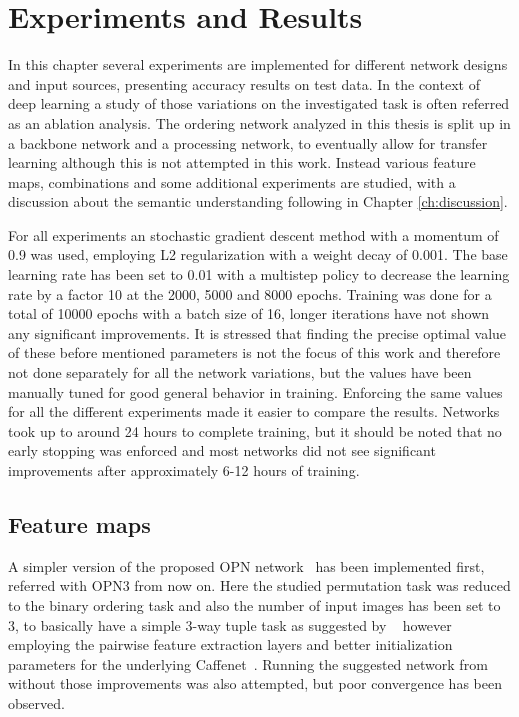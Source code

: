%
\newpage
\chapter{Experiments and Results}
\label{ch:experimentsandresults}
In this chapter several experiments are implemented for different network designs and input sources, presenting accuracy results on test data. In the context of deep learning a study of those variations on the investigated task is often referred as an ablation analysis. The ordering network analyzed in this thesis is split up in a backbone network and a processing network, to eventually allow for transfer learning although this is not attempted in this work. Instead various feature maps, combinations and some additional experiments are studied, with a discussion about the semantic understanding following in Chapter \ref{ch:discussion}.

For all experiments an stochastic gradient descent method with a momentum of 0.9 was used, employing L2 regularization with a weight decay of 0.001. The base learning rate has been set to 0.01 with a multistep policy to decrease the learning rate by a factor 10 at the 2000, 5000 and 8000 epochs. Training was done for a total of 10000 epochs with a batch size of 16, longer iterations have not shown any significant improvements. It is stressed that finding the precise optimal value of these before mentioned parameters is not the focus of this work and therefore not done separately for all the network variations, but the values have been manually tuned for good general behavior in training. Enforcing the same values for all the different experiments made it easier to compare the results. Networks took up to around 24 hours to complete training, but it should be noted that no early stopping was enforced and most networks did not see significant improvements after approximately 6-12 hours of training.

\section{Feature maps}
A simpler version of the proposed OPN network~\cite{lee2017} has been implemented first, referred with OPN3 from now on. Here the studied permutation task was reduced to the binary ordering task and also the number of input images has been set to 3, to basically have a simple 3-way tuple task as suggested by ~\cite{misra2016} however employing the pairwise feature extraction layers and better initialization parameters for the underlying Caffenet~\cite{jia2014}. Running the suggested network from~\cite{misra2016} without those improvements was also attempted, but poor convergence has been observed. 

